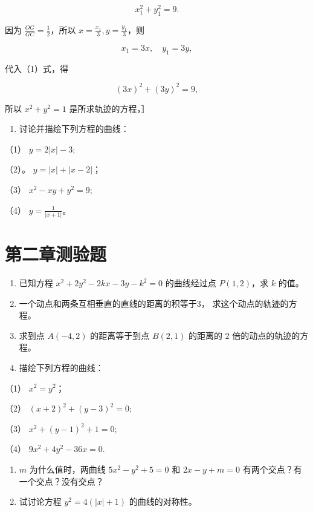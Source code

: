 \[
x_{1} ^ {2} + y_{1} ^ {2} = 9. \tag {1}
\]

因为 \(\frac{OG}{GC} = \frac{1}{2}\)，所以
\(x = \frac{x_1}{3}, y = \frac{y_1}{3}\)，则

\[
x_{1} = 3 x, \quad y_{1} = 3 y,
\]

代入（1）式，得

\[
(3 x) ^ {2} + (3 y) ^ {2} = 9,
\]

所以 \(x^{2} + y^{2} = 1\) 是所求轨迹的方程，］

\begin{enumerate}
\def\labelenumi{\arabic{enumi}.}
\setcounter{enumi}{8}
\tightlist
\item
  讨论并描绘下列方程的曲线：
\end{enumerate}

（1） \(y = 2|x| - 3;\)

（2）。 \(y = |x| + |x - 2|\)；

（3） \(x^{2} - xy + y^{2} = 9;\)

（4） \(y = \frac{1}{|x + 1|}\)。

\section{第二章测验题}\label{ux7b2cux4e8cux7ae0ux6d4bux9a8cux9898}

\begin{enumerate}
\def\labelenumi{\arabic{enumi}.}
\item
  已知方程 \(x^{2} + 2y^{2} - 2kx - 3y - k^{2} = 0\) 的曲线经过点
  \(P(1,2)\)，求 \(k\) 的值。
\item
  一个动点和两条互相垂直的直线的距离的积等于3， 求这个动点的轨迹的方程。
\item
  求到点 \(A(-4, 2)\) 的距离等于到点 \(B(2, 1)\) 的距离的 2
  倍的动点的轨迹的方程。
\item
  描绘下列方程的曲线：
\end{enumerate}

（1） \(x^{2} = y^{2}\)；

（2） \((x + 2)^{2} + (y - 3)^{2} = 0;\)

（3） \(x^{2} + (y - 1)^{2} + 1 = 0;\)

（4） \(9x^{2} + 4y^{2} - 36x = 0.\)

\begin{enumerate}
\def\labelenumi{\arabic{enumi}.}
\setcounter{enumi}{4}
\item
  \(m\) 为什么值时，两曲线 \(5x^{2} - y^{2} + 5 = 0\) 和
  \(2x - y + m = 0\) 有两个交点？有一个交点？没有交点？
\item
  试讨论方程 \(y^{2} = 4(|x| + 1)\) 的曲线的对称性。
\end{enumerate}


